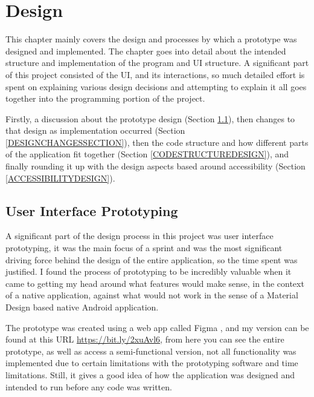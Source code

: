 \chapter{Design}

This chapter mainly covers the design and processes by which a prototype was designed and implemented. The chapter goes into detail about the intended structure and implementation of the program and UI structure. A significant part of this project consisted of the UI, and its interactions, so much detailed effort is spent on explaining various design decisions and attempting to explain it all goes together into the programming portion of the project.

Firstly, a discussion about the prototype design (Section \ref{PROTOTYPESECTION}), then changes to that design as implementation occurred (Section \ref{DESIGNCHANGESSECTION}), then the code structure and how different parts of the application fit together (Section \ref{CODESTRUCTUREDESIGN}), and finally rounding it up with the design aspects based around accessibility (Section \ref{ACCESSIBILITYDESIGN}).


\section{User Interface Prototyping} \label {PROTOTYPESECTION}
A significant part of the design process in this project was user interface prototyping, it was the main focus of a sprint and was the most significant driving force behind the design of the entire application, so the time spent was justified. I found the process of prototyping to be incredibly valuable when it came to getting my head around what features would make sense, in the context of a native application, against what would not work in the sense of a Material Design based native Android application.

The prototype was created using a web app called Figma \cite{FIGMA}, and my version can be found at this URL \url{https://bit.ly/2xuAvl6}, from here you can see the entire prototype, as well as access a semi-functional version, not all functionality was implemented due to certain limitations with the prototyping software and time limitations. Still, it gives a good idea of how the application was designed and intended to run before any code was written.

